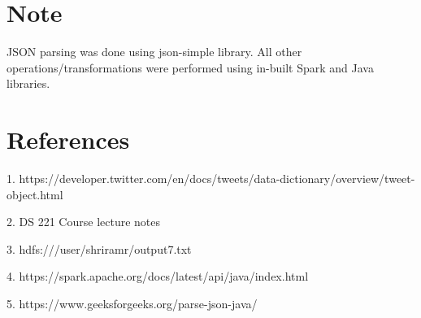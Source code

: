 \documentclass[11pt,a4paper,oneside]{article}
\begin{document}
    \section{Note}
    JSON parsing was done using json-simple library. All other operations/transformations were performed using in-built Spark and Java libraries.
        
    \section{References}
    \begin{list}{}{}
    	\item 1. https://developer.twitter.com/en/docs/tweets/data-dictionary/overview/tweet-object.html
    	\item 2. DS 221 Course lecture notes
    	\item 3. hdfs:///user/shriramr/output7.txt
    	\item 4. https://spark.apache.org/docs/latest/api/java/index.html
    	\item 5. https://www.geeksforgeeks.org/parse-json-java/
    \end{list}  
    
\end{document}

